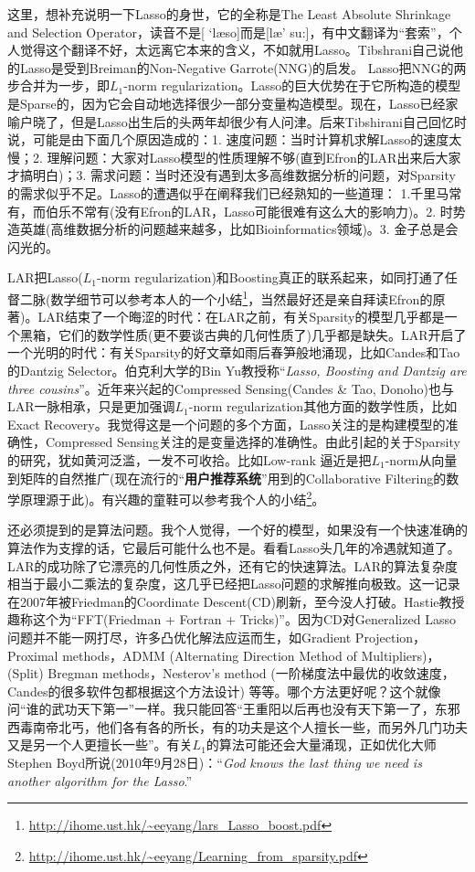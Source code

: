 \documentclass{cosart-xetex}
\begin{document}
这里，想补充说明一下Lasso的身世，它的全称是The Least Absolute Shrinkage and Selection Operator，读音不是[ `l\ae so]而是[l\ae' su:]，有中文翻译为“套索”，个人觉得这个翻译不好，太远离它本来的含义，不如就用Lasso。Tibshrani自己说他的Lasso是受到Breiman的Non-Negative Garrote(NNG)的启发。 Lasso把NNG的两步合并为一步，即$L_1$-norm regularization。Lasso的巨大优势在于它所构造的模型是Sparse的，因为它会自动地选择很少一部分变量构造模型。现在，Lasso已经家喻户晓了，但是Lasso出生后的头两年却很少有人问津。后来Tibshirani自己回忆时说，可能是由下面几个原因造成的：1. 速度问题：当时计算机求解Lasso的速度太慢；2. 理解问题：大家对Lasso模型的性质理解不够(直到Efron的LAR出来后大家才搞明白)；3. 需求问题：当时还没有遇到太多高维数据分析的问题，对Sparsity的需求似乎不足。Lasso的遭遇似乎在阐释我们已经熟知的一些道理： 1.千里马常有，而伯乐不常有(没有Efron的LAR，Lasso可能很难有这么大的影响力)。2. 时势造英雄(高维数据分析的问题越来越多，比如Bioinformatics领域)。3. 金子总是会闪光的。

LAR把Lasso($L_1$-norm regularization)和Boosting真正的联系起来，如同打通了任督二脉(数学细节可以参考本人的一个小结\footnote[1]{\url{http://ihome.ust.hk/~eeyang/lars_Lasso_boost.pdf}}，当然最好还是亲自拜读Efron的原著)。LAR结束了一个晦涩的时代：在LAR之前，有关Sparsity的模型几乎都是一个黑箱，它们的数学性质(更不要谈古典的几何性质了)几乎都是缺失。LAR开启了一个光明的时代：有关Sparsity的好文章如雨后春笋般地涌现，比如Candes和Tao的Dantzig Selector。伯克利大学的Bin Yu教授称“\textit{Lasso, Boosting and Dantzig are three cousins}”。近年来兴起的Compressed Sensing(Candes \& Tao, Donoho)也与LAR一脉相承，只是更加强调$L_1$-norm regularization其他方面的数学性质，比如Exact Recovery。我觉得这是一个问题的多个方面，Lasso关注的是构建模型的准确性，Compressed Sensing关注的是变量选择的准确性。由此引起的关于Sparsity的研究，犹如黄河泛滥，一发不可收拾。比如Low-rank 逼近是把$L_1$-norm从向量到矩阵的自然推广(现在流行的“\textbf{用户推荐系统}”用到的Collaborative Filtering的数学原理源于此)。有兴趣的童鞋可以参考我个人的小结\footnote[2]{\url{http://ihome.ust.hk/~eeyang/Learning_from_sparsity.pdf}}。

还必须提到的是算法问题。我个人觉得，一个好的模型，如果没有一个快速准确的算法作为支撑的话，它最后可能什么也不是。看看Lasso头几年的冷遇就知道了。LAR的成功除了它漂亮的几何性质之外，还有它的快速算法。LAR的算法复杂度相当于最小二乘法的复杂度，这几乎已经把Lasso问题的求解推向极致。这一记录在2007年被Friedman的Coordinate Descent(CD)刷新，至今没人打破。Hastie教授趣称这个为“FFT(Friedman + Fortran + Tricks)”。因为CD对Generalized Lasso问题并不能一网打尽，许多凸优化解法应运而生，如Gradient Projection， Proximal methods，ADMM (Alternating Direction Method of Multipliers)， (Split) Bregman methods，Nesterov's method (一阶梯度法中最优的收敛速度，Candes的很多软件包都根据这个方法设计) 等等。哪个方法更好呢？这个就像问“谁的武功天下第一”一样。我只能回答“王重阳以后再也没有天下第一了，东邪西毒南帝北丐，他们各有各的所长，有的功夫是这个人擅长一些，而另外几门功夫又是另一个人更擅长一些”。有关$L_1$的算法可能还会大量涌现，正如优化大师Stephen Boyd所说(2010年9月28日)：“\textit{God knows the last thing we need is another algorithm for the Lasso}.”
\end{document}
